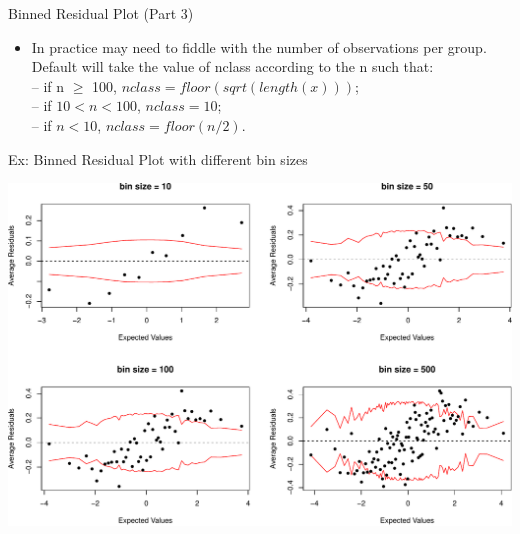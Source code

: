\documentclass[ignorenonframetext,]{beamer}
\providecommand{\tightlist}{%
  \setlength{\itemsep}{0pt}\setlength{\parskip}{0pt}}
\begin{document}
\begin{frame}{Binned Residual Plot (Part 3)}

\begin{itemize}
\tightlist
\item
  In practice may need to fiddle with the number of observations per
  group. Default will take the value of nclass according to the n such
  that:\\
  -- if n \(\ge\) 100, \(nclass=floor(sqrt(length(x)))\);\\
  -- if \(10<n<100\), \(nclass=10\);\\
  -- if \(n<10\), \(nclass=floor(n/2)\).
\end{itemize}

\end{frame}

\begin{frame}{Ex: Binned Residual Plot with different bin sizes}

\includegraphics{lec7_files/figure-beamer/unnamed-chunk-5-1.pdf}

\end{frame}
\end{document}
